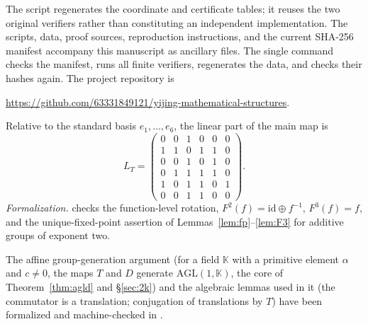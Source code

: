 \documentclass[11pt]{article}
\begin{document}
The script  regenerates the coordinate and
certificate tables; it reuses the two original verifiers rather than constituting
an independent implementation. The scripts, data, proof sources, reproduction
instructions, and the current SHA-256 manifest accompany this manuscript as
ancillary files. The single command  checks
the manifest, runs all finite verifiers, regenerates the data, and checks their
hashes again.
The project repository is
\begin{center}
\small\url{https://github.com/63331849121/yijing-mathematical-structures}.
\end{center}
Relative to the standard basis $e_1,\dots,e_6$, the linear part of the main map is
\[
L_T=\begin{pmatrix}
0&0&1&0&0&0\\
1&1&0&1&1&0\\
0&0&1&0&1&0\\
0&1&1&1&1&0\\
1&0&1&1&0&1\\
0&0&1&1&0&0
\end{pmatrix}.
\]
\emph{Formalization.}  checks
the function-level rotation, $F^2(f)=\mathrm{id}\oplus f^{-1}$,
$F^3(f)=f$, and the unique-fixed-point assertion of
Lemmas~\ref{lem:fp}--\ref{lem:F3} for additive groups of exponent two.

The affine group-generation argument (for a field $\mathbb K$ with a primitive
element $\alpha$ and $c\ne0$, the maps $T$ and $D$ generate $\mathrm{AGL}(1,\mathbb K)$, the core
of Theorem~\ref{thm:agld} and \S\ref{sec:2k}) and the algebraic lemmas used in it (the commutator
is a translation; conjugation of translations by $T$) have been formalized and
machine-checked in .
\end{document}
